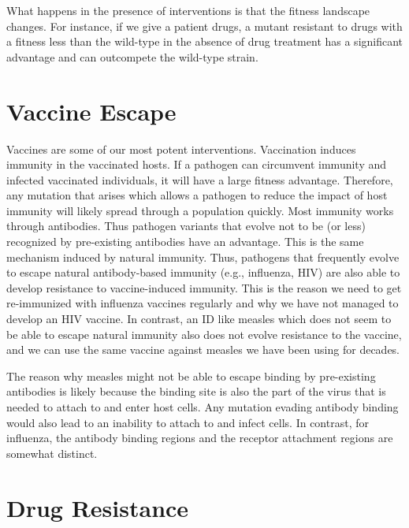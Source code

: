 \documentclass[]{book}
\theoremstyle{definition}
\theoremstyle{definition}
\theoremstyle{definition}
\theoremstyle{remark}
\begin{document}
What happens in the presence of interventions is that the fitness
landscape changes. For instance, if we give a patient drugs, a mutant
resistant to drugs with a fitness less than the wild-type in the absence
of drug treatment has a significant advantage and can outcompete the
wild-type strain.

\section{Vaccine Escape}\label{vaccine-escape}

Vaccines are some of our most potent interventions. Vaccination induces
immunity in the vaccinated hosts. If a pathogen can circumvent immunity
and infected vaccinated individuals, it will have a large fitness
advantage. Therefore, any mutation that arises which allows a pathogen
to reduce the impact of host immunity will likely spread through a
population quickly. Most immunity works through antibodies. Thus
pathogen variants that evolve not to be (or less) recognized by
pre-existing antibodies have an advantage. This is the same mechanism
induced by natural immunity. Thus, pathogens that frequently evolve to
escape natural antibody-based immunity (e.g., influenza, HIV) are also
able to develop resistance to vaccine-induced immunity. This is the
reason we need to get re-immunized with influenza vaccines regularly and
why we have not managed to develop an HIV vaccine. In contrast, an ID
like measles which does not seem to be able to escape natural immunity
also does not evolve resistance to the vaccine, and we can use the same
vaccine against measles we have been using for decades.

The reason why measles might not be able to escape binding by
pre-existing antibodies is likely because the binding site is also the
part of the virus that is needed to attach to and enter host cells. Any
mutation evading antibody binding would also lead to an inability to
attach to and infect cells. In contrast, for influenza, the antibody
binding regions and the receptor attachment regions are somewhat
distinct.

\section{Drug Resistance}\label{drug-resistance}
\end{document}

